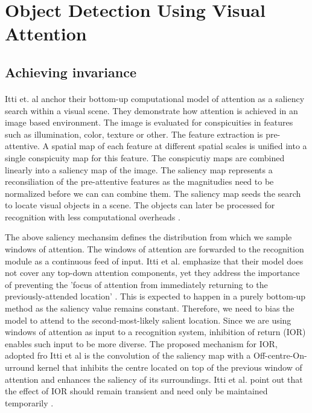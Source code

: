 \documentclass{report}
\begin{document}
\section{Object Detection Using Visual Attention}

\subsection{Achieving invariance}

\paragraph{}Itti et. al anchor their bottom-up computational model of attention as a saliency search within a visual scene. They demonstrate how attention is achieved in an image based environment. The image is evaluated for conspicuities in features such as illumination, color, texture or other. The feature extraction is pre-attentive. A spatial map of each feature at different spatial scales is unified into a single conspicuity map for this feature. The conspicutiy maps are combined linearly into a saliency map of the image. The saliency map represents a reconsiliation of the pre-attentive features as the magnitudies need to be normalized before we can can combine them. The saliency map seeds the search to locate visual objects in a scene. The objects can later be processed for recognition with less computational overheads \cite{Itti2000, Itti2001}.

The above saliency mechansim defines the distribution from which we sample windows of attention. The windows of attention are forwarded to the recognition module as a continuous feed of input. Itti et al. emphasize that their model does not cover any top-down attention components, yet they address the importance of preventing the 'focus of attention from immediately returning to the previously-attended location' \cite{Itti2000}. This is expected to happen in a purely bottom-up method as the saliency value remains constant. Therefore, we need to bias the model to attend to the second-most-likely salient location. Since we are using windows of attention as input to a recognition system, inhibition of return (IOR) enables such input to be more diverse. The proposed mechanism for IOR, adopted fro Itti et al is the convolution of the saliency map with a Off-centre-On-urround kernel that inhibits the centre located on top of the previous window of attention and enhances the saliency of its surroundings. Itti et al. point out that the effect of IOR should remain transient and need only be maintained temporarily \cite{Itti2000}.
\end{document}

